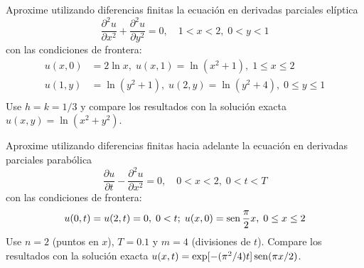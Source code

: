 \documentclass[11pt]{article}
\begin{document}
\begin{question} %
Aproxime utilizando diferencias finitas la ecuación en derivadas parciales elíptica
\[ \frac{\partial^2 u}{\partial x^2} +  \frac{\partial^2 u}{\partial y^2} = 0, \quad 1 < x < 2, \; 0 < y < 1 \]
con las condiciones de frontera:
\begin{align*}
    u(x, 0) &= 2 \ln x,\; u(x, 1) = \ln(x^2 + 1),\; 1 \leq x \leq 2 \\
    u(1, y) &= \ln(y^2 + 1),\; u(2, y) = \ln(y^2 + 4),\; 0 \leq y \leq 1 \\
\end{align*}
Use $h = k = 1/3$ y compare los resultados con la solución exacta $u(x, y) = \ln(x^2 + y^2)$.
\end{question}

\begin{question} %
Aproxime utilizando diferencias finitas hacia adelante la ecuación en derivadas parciales parabólica
\[ \frac{\partial u}{\partial t} - \frac{\partial^2 u}{\partial x^2} = 0, \quad 0 < x < 2, \; 0 < t < T \]
con las condiciones de frontera:
\begin{equation*}
    u(0, t) = u(2, t) = 0,\;0 < t; \; u(x, 0) = \operatorname{sen} \frac{\pi}{2} x, \; 0 \leq x \leq 2 
\end{equation*}
Use $n = 2$ (puntos en $x$), $T = 0.1$ y $m = 4$ (divisiones de $t$). Compare los resultados con la solución exacta $u(x, t) = \exp[-(\pi^2/4) t] \operatorname{sen}(\pi x/ 2)$.
\end{question}
\end{document}

